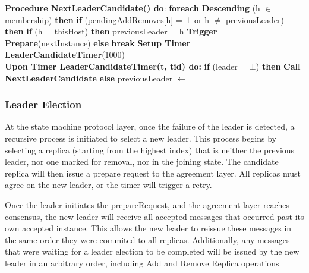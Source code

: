 \documentclass[sigconf]{acmart}
\begin{document}
\begin{algorithmic}[1]
\State \textbf{Procedure NextLeaderCandidate() do}:
\State \quad \textbf{foreach Descending} (h $\in$ membership) \textbf{then}
\State \quad \quad \textbf{if} (pendingAddRemoves[h] = $\bot$ or h $\neq$ previousLeader) \textbf{then}
\State \quad \quad \quad \textbf{if} (h = thisHost) \textbf{then}
\State \quad \quad \quad \quad previousLeader = h
\State \quad \quad \quad \quad \textbf{Trigger Prepare}(nextInstance)
\State \quad \quad \quad \textbf{else}
\State \quad \quad \quad \quad \textbf{break}
\State \quad \textbf{Setup Timer LeaderCandidateTimer}(1000) \\

\State \textbf{Upon Timer LeaderCandidateTimer(t, tid) do:}
\State \quad \textbf{if} (leader = $\bot$) \textbf{then}
\State \quad \quad \textbf{Call NextLeaderCandidate}
\State \quad \textbf{else}
\State \quad \quad previousLeader $\gets$ 

\end{algorithmic}

\subsubsection{Leader Election}
At the state machine protocol layer, once the failure of the leader is detected, a recursive process is initiated to select a new leader. This process begins by selecting a replica (starting from the highest index) that is neither the previous leader, nor one marked for removal, nor in the joining state. The candidate replica will then issue a prepare request to the agreement layer. All replicas must agree on the new leader, or the timer will trigger a retry.

Once the leader initiates the prepareRequest, and the agreement layer reaches consensus, the new leader will receive all accepted messages that occurred past its own accepted instance. This allows the new leader to reissue these messages in the same order they were commited to all replicas. Additionally, any messages that were waiting for a leader election to be completed will be issued by the new leader in an arbitrary order, including Add and Remove Replica operations
\end{document}
